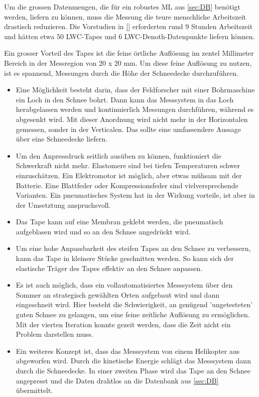 Um die grossen Datenmengen, die für ein robustes ML aus \ref{sec:DB} benötigt werden, liefern zu können, muss die Messung die teure menschliche Arbeitszeit drastisch reduzieren. Die Vorstudien in \ref{} erforderten rund 9 Stunden Arbeitszeit und hätten etwa 50 LWC-Tapes und 6 LWC-Denoth-Datenpunkte liefern können.

Ein grosser Vorteil des Tapes ist die feine örtliche Auflösung im zentel Millimeter Bereich in der Messregion von 20 x 20 mm. Um diese feine Auflösung zu nutzen, ist es spannend, Messungen durch die Höhe der Schneedecke durchzuführen.

\begin{itemize}
\item Eine Möglichkeit besteht darin, dass der Feldforscher mit einer Bohrmaschine ein Loch in den Schnee bohrt. Dann kann das Messsystem in das Loch herabgelassen werden und kontinuierlich Messungen durchführen, während es abgesenkt wird. Mit dieser Anordnung wird nicht mehr in der Horizontalen gemessen, sonder in der Verticalen. Das sollte eine umfassendere Aussage über eine Schneedecke liefern.

\item Um den Anpressdruck seitlich ausüben zu können, funktioniert die Schwerkraft nicht mehr. Elastomere sind bei tiefen Temperaturen schwer einzuschätzen. Ein Elektromotor ist möglich, aber etwas mühsam mit der Batterie. Eine Blattfeder oder Kompressionsfeder sind vielversprechende Varianten. Ein pneumatisches System hat in der Wirkung vorteile, ist aber in der Umsetztung anspruchsvoll.

\item Das Tape kann auf eine Membran geklebt werden, die pneumatisch aufgeblasen wird und so an den Schnee angedrückt wird.

\item Um eine hohe Anpassbarkeit des steifen Tapes an den Schnee zu verbessern, kann das Tape in kleinere Stücke geschnitten werden. So kann sich der elastische Träger des Tapes effektiv an den Schnee anpassen.

\item Es ist auch möglich, dass ein vollautomatisiertes Messsystem über den Sommer an strategisch gewählten Orten aufgebaut wird und dann eingeschneit wird. Hier besteht die Schwierigkeit, an genügend 'ungetesteten' guten Schnee zu gelangen, um eine feine zeitliche Auflösung zu ermöglichen. Mit der vierten Iteration konnte gezeit werden, dass die Zeit nicht ein Problem darstellen muss.


\item Ein weiteres Konzept ist, dass das Messsystem von einem Helikopter aus abgeworfen wird. Durch die kinetische Energie schlägt das Messsystem dann durch die Schneedecke. In einer zweiten Phase wird das Tape an den Schnee angepresst und die Daten drahtlos an die Datenbank aus \ref{sec:DB} übermittelt.

\end{itemize}


